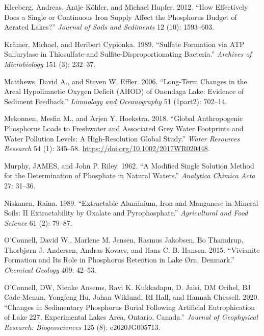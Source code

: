 \documentclass[a4paper,11pt]{article}
\newenvironment{CSLReferences}%
  {}%
  {\par}
\begin{document}
\begin{CSLReferences}{1}{0}
\leavevmode\hypertarget{ref-kleebergHowEffectivelyDoes2012}{}%
Kleeberg, Andreas, Antje Köhler, and Michael Hupfer. 2012. {``How Effectively Does a Single or Continuous Iron Supply Affect the Phosphorus Budget of Aerated Lakes?''} \emph{Journal of Soils and Sediments} 12 (10): 1593--603.

\leavevmode\hypertarget{ref-kramerSulfateFormationATP1989}{}%
Krämer, Michael, and Heribert Cypionka. 1989. {``Sulfate Formation via {ATP} Sulfurylase in Thiosulfate-and Sulfite-Disproportionating Bacteria.''} \emph{Archives of Microbiology} 151 (3): 232--37.

\leavevmode\hypertarget{ref-matthewsLongTermChanges2006}{}%
Matthews, David A., and Steven W. Effler. 2006. {``Long-Term Changes in the Areal Hypolimnetic Oxygen Deficit ({AHOD}) of {Onondaga Lake}: {Evidence} of Sediment Feedback.''} \emph{Limnology and Oceanography} 51 (1part2): 702--14.

\leavevmode\hypertarget{ref-mekonnenGlobalAnthropogenicPhosphorus2018}{}%
Mekonnen, Mesfin M., and Arjen Y. Hoekstra. 2018. {``Global {Anthropogenic Phosphorus Loads} to {Freshwater} and {Associated Grey Water Footprints} and {Water Pollution Levels}: {A High}-{Resolution Global Study}.''} \emph{Water Resources Research} 54 (1): 345--58. \url{https://doi.org/10.1002/2017WR020448}.

\leavevmode\hypertarget{ref-murphyModifiedSingleSolution1962}{}%
Murphy, JAMES, and John P. Riley. 1962. {``A Modified Single Solution Method for the Determination of Phosphate in Natural Waters.''} \emph{Analytica Chimica Acta} 27: 31--36.

\leavevmode\hypertarget{ref-niskanenExtractableAluminiumIron1989}{}%
Niskanen, Raina. 1989. {``Extractable Aluminium, Iron and Manganese in Mineral Soils: {II Extractability} by Oxalate and Pyrophosphate.''} \emph{Agricultural and Food Science} 61 (2): 79--87.

\leavevmode\hypertarget{ref-oconnellVivianiteFormationIts2015}{}%
O'Connell, David W., Marlene M. Jensen, Rasmus Jakobsen, Bo Thamdrup, Thorbjørn J. Andersen, Andras Kovacs, and Hans C. B. Hansen. 2015. {``Vivianite Formation and Its Role in Phosphorus Retention in {Lake Ørn}, {Denmark}.''} \emph{Chemical Geology} 409: 42--53.

\leavevmode\hypertarget{ref-oconnellChangesSedimentaryPhosphorus2020}{}%
O'Connell, DW, Nienke Ansems, Ravi K. Kukkadapu, D. Jaisi, DM Orihel, BJ Cade-Menun, Yongfeng Hu, Johan Wiklund, RI Hall, and Hannah Chessell. 2020. {``Changes in Sedimentary Phosphorus Burial Following Artificial Eutrophication of {Lake} 227, {Experimental Lakes Area}, {Ontario}, {Canada}.''} \emph{Journal of Geophysical Research: Biogeosciences} 125 (8): e2020JG005713.


\end{CSLReferences}
\end{document}
